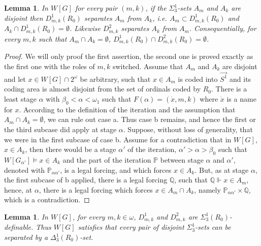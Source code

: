 \documentclass[a4paper,11pt]{article}
\newtheorem{lemma}[theorem]{Lemma}
\newcommand{\forceP}{\mathbb{P}}
\newcommand{\forceQ}{\mathbb{Q}}
\begin{document}
\begin{lemma}
In $W[G]$ for every pair $(m,k)$, if the $\Sigma^1_3$-sets $A_m$ and $A_k$ are disjoint then $D^1_{m,k}(R_0)$  separates $A_m$ from $A_k$, i.e. $A_m \subset D^1_{m,k}(R_0)$ and $A_k \cap D^1_{m,k}(R_0)=\emptyset$. Likewise $D^2_{m,k}$ separates $A_k$ from $A_m$. Consequentially, for every $m,k$ such that $A_m \cap A_k = \emptyset$, $D^1_{m,k}(R_0) \cap D^2_{m,k}(R_0)=\emptyset$.
\end{lemma}
 \begin{proof}
We will only proof the first assertion, the second one is proved exactly as the first one with the roles of $m,k$ switched. Assume that $A_m$ and $A_k$ are disjoint and let $x \in W[G] \cap 2^{\omega}$ be arbitrary, such that $x \in A_m$ is coded into $\vec{S^1}$ and its coding area is almost disjoint from the set of ordinals coded by $R_0$.
 There is a least stage $\alpha$ with $\beta_0<\alpha< \omega_1$ such that $F(\alpha)= (\dot{x},m,k)$ where $\dot{x}$ is a name for $x$. According to the definition of the iteration and the assumption that $A_m \cap A_k=\emptyset$, we can rule out case a. Thus case b remains, and hence the first or the third subcase did apply at stage $\alpha$.  Suppose, without loss of generality, that we were in the first subcase of case b. 
Assume for a contradiction that in $W[G]$, $x \in A_k$, then there would be a stage $\alpha'$ of the iteration, $\alpha'> \alpha> \beta_0$ such that  $W[G_{\alpha'}] \models x \in A_k$ and the part of the iteration $\forceP$ between stage $\alpha$ and $\alpha'$, denoted with $\forceP_{\alpha \alpha'}$, is a legal forcing, and which forces $x \in A_k$. But, as at stage $\alpha$, the first subcase of b applied, there is a legal forcing $\forceQ$, such that $\forceQ \Vdash x \in A_m$, hence, at $\alpha$, there is a legal forcing 
 which forces $x \in A_m \cap A_k$, namely $\forceP_{\alpha \alpha'} \times \forceQ$, which is a contradiction.

 \end{proof}


\begin{lemma}\label{Sigma13}
In $W[G]$, for every $m,k \in \omega$, $D^1_{m,k}$ and $D^2_{m,k}$ are $\Sigma^1_3(R_0)$-definable. Thus $W[G]$ satisfies that every pair of disjoint $\Sigma^1_3$-sets can be separated by a $\Delta^1_3 (R_0)$-set.
\end{lemma}
\end{document}

